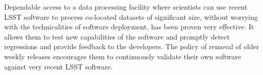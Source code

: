 Dependable access to a data processing facility where scientists can use recent LSST software to process co-located datasets of significant size, without worrying with the technicalities of software deployment, has been proven very effective. It allows them to test new capabilities of the software and promptly detect regressions and provide feedback to the developers. The policy of removal of older weekly releases encourages them to continuously validate their own software against very recent LSST software.
